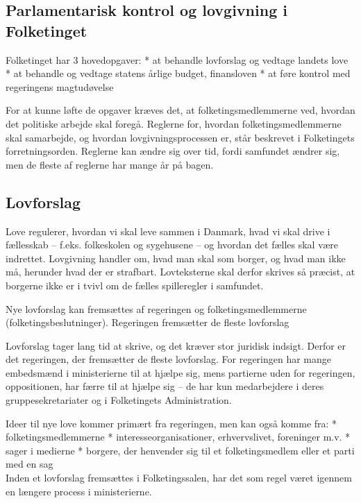 \documentclass[]{book}
\begin{document}
\hypertarget{parlamentarisk-kontrol-og-lovgivning-i-folketinget}{%
\subsection{Parlamentarisk kontrol og lovgivning i Folketinget}\label{parlamentarisk-kontrol-og-lovgivning-i-folketinget}}

Folketinget har 3 hovedopgaver:
* at behandle lovforslag og vedtage landets love
* at behandle og vedtage statens årlige budget, finansloven
* at føre kontrol med regeringens magtudøvelse

For at kunne løfte de opgaver kræves det, at folketingsmedlemmerne ved, hvordan det politiske arbejde skal foregå. Reglerne for, hvordan folketingsmedlemmerne skal samarbejde, og hvordan lovgivningsprocessen er, står beskrevet i Folketingets forretningsorden. Reglerne kan ændre sig over tid, fordi samfundet ændrer sig, men de fleste af reglerne har mange år på bagen.

\hypertarget{lovforslag}{%
\subsection{Lovforslag}\label{lovforslag}}

Love regulerer, hvordan vi skal leve sammen i Danmark, hvad vi skal drive i fællesskab -- f.eks. folkeskolen og sygehusene -- og hvordan det fælles skal være indrettet. Lovgivning handler om, hvad man skal som borger, og hvad man ikke må, herunder hvad der er strafbart. Lovteksterne skal derfor skrives så præcist, at borgerne ikke er i tvivl om de fælles spilleregler i samfundet.

Nye lovforslag kan fremsættes af regeringen og folketingsmedlemmerne (folketingsbeslutninger).
Regeringen fremsætter de fleste lovforslag

Lovforslag tager lang tid at skrive, og det kræver stor juridisk indsigt. Derfor er det regeringen, der fremsætter de fleste lovforslag. For regeringen har mange embedsmænd i ministerierne til at hjælpe sig, mens partierne uden for regeringen, oppositionen, har færre til at hjælpe sig -- de har kun medarbejdere i deres gruppesekretariater og i Folketingets Administration.

Ideer til nye love kommer primært fra regeringen, men kan også komme fra:
* folketingsmedlemmerne
* interesseorganisationer, erhvervslivet, foreninger m.v.
* sager i medierne
* borgere, der henvender sig til et folketingsmedlem eller et parti med en sag\\
Inden et lovforslag fremsættes i Folketingssalen, har det som regel været igennem en længere process i ministerierne.
\end{document}
